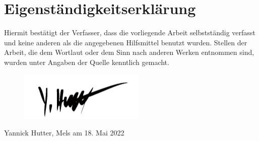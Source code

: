 \documentclass[12pt, oneside]{article}
\begin{document}
\clearpage
\section*{Eigenständigkeitserklärung}
Hiermit bestätigt der Verfasser, dass die vorliegende Arbeit selbstständig verfasst und keine anderen als die angegebenen Hilfsmittel benutzt wurden. Stellen der Arbeit, die dem Wortlaut oder dem Sinn nach anderen Werken entnommen sind, wurden unter Angaben der Quelle kenntlich gemacht.

\begin{figure}[ht]
    \includegraphics[width=6cm]{images/signature.png}
\end{figure}
Yannick Hutter, Mels am 18. Mai 2022
\end{document}
